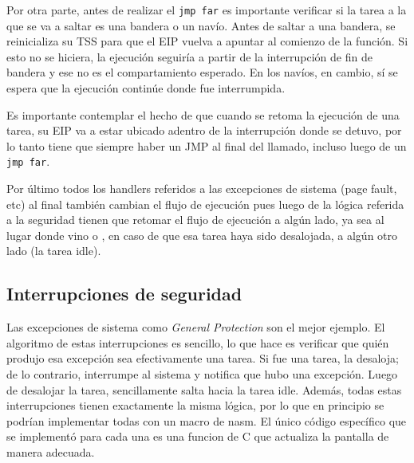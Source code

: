 	Por otra parte, antes de realizar el \texttt{jmp far} es importante
verificar si la tarea a la que se va a saltar es una bandera o un
navío. Antes de saltar a una bandera, se reinicializa su TSS para
que el EIP vuelva a apuntar al comienzo de la función. Si esto no se hiciera, 
la ejecución seguiría a partir de la interrupción de fin de bandera
y ese no es el compartamiento esperado. En los navíos, en cambio, sí se espera
que la ejecución continúe donde fue interrumpida.

	Es importante contemplar el hecho de que cuando se retoma la ejecución de una tarea, 
su EIP va a estar ubicado adentro de la interrupción donde se detuvo, por lo tanto tiene 
que siempre haber un JMP al final del llamado, incluso luego de un \texttt{jmp far}.
	
	Por último todos los handlers referidos a las excepciones de
sistema (page fault, etc) al final también cambian el flujo de ejecución
pues luego de la lógica referida a la seguridad tienen que retomar
el flujo de ejecución a algún lado, ya sea al lugar donde vino o
, en caso de que esa tarea haya sido desalojada, a algún otro lado
(la tarea idle).

\subsection{Interrupciones de seguridad}

	Las excepciones de sistema como \textit{General Protection}
son el mejor ejemplo. El algoritmo de estas interrupciones es
sencillo, lo que hace es verificar que quién produjo
esa excepción sea efectivamente una tarea. Si fue una tarea, la desaloja; de lo 
contrario, interrumpe al sistema y notifica que hubo una excepción. Luego
de desalojar la tarea, sencillamente salta hacia la tarea idle. Además, 
todas estas interrupciones tienen exactamente la misma lógica, por lo 
que en principio se podrían implementar todas con un macro de nasm.
El único código específico que se implementó para cada una es una funcion de C
que actualiza la pantalla de manera adecuada.


